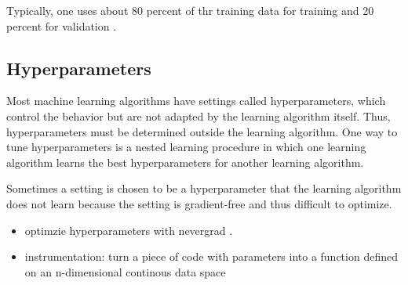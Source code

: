 \documentclass{scrartcl}
\begin{document}
Typically, one uses about 80 percent of thr training data for training and 20 percent for validation \cite{Goodfellow2016}. 


\subsection{Hyperparameters}

Most machine learning algorithms have settings called hyperparameters, which control the behavior but are not adapted by the learning algorithm itself. Thus, hyperparameters must be determined outside the learning algorithm. One way to tune hyperparameters is a nested learning procedure in which one learning algorithm learns the best hyperparameters for another learning algorithm. 

Sometimes a setting is chosen to be a hyperparameter that the learning algorithm does not learn because the setting is gradient-free and thus difficult to optimize.  


\begin{itemize}
\item optimzie hyperparameters with nevergrad \cite{nevergrad}.
\item instrumentation: turn a piece of code with parameters into a function defined on an n-dimensional continous data space
\end{itemize}


\end{document}
